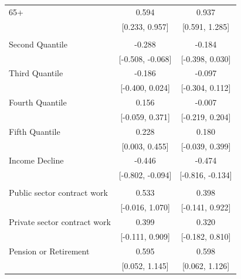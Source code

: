 \documentclass[
  10,
  letterpaper,
  DIV=11,
  numbers=noendperiod]{scrartcl}
\begin{document}
\begin{table}
\begin{tabular}[t]{lcc}
\hspace{1em}65+ & 0.594 & 0.937\\
\hspace{1em} & {}[0.233, 0.957] & {}[0.591, 1.285]\\
\addlinespace[0.3em]
\multicolumn{3}{l}{\cellcolor[HTML]{3498DB}{\textbf{Income}}}\\
\hspace{1em}Second Quantile & -0.288 & -0.184\\
\hspace{1em} & {}[-0.508, -0.068] & {}[-0.398, 0.030]\\
\hspace{1em}Third Quantile & -0.186 & -0.097\\
\hspace{1em} & {}[-0.400, 0.024] & {}[-0.304, 0.112]\\
\hspace{1em}Fourth Quantile & 0.156 & -0.007\\
\hspace{1em} & {}[-0.059, 0.371] & {}[-0.219, 0.204]\\
\hspace{1em}Fifth Quantile & 0.228 & 0.180\\
\hspace{1em} & {}[0.003, 0.455] & {}[-0.039, 0.399]\\
\hspace{1em}Income Decline & -0.446 & -0.474\\
\hspace{1em} & {}[-0.802, -0.094] & {}[-0.816, -0.134]\\
\addlinespace[0.3em]
\multicolumn{3}{l}{\cellcolor[HTML]{3498DB}{\textbf{Income Source}}}\\
\hspace{1em}Public sector contract work & 0.533 & 0.398\\
\hspace{1em} & {}[-0.016, 1.070] & {}[-0.141, 0.922]\\
\hspace{1em}Private sector contract work & 0.399 & 0.320\\
\hspace{1em} & {}[-0.111, 0.909] & {}[-0.182, 0.810]\\
\hspace{1em}Pension or Retirement & 0.595 & 0.598\\
\hspace{1em} & {}[0.052, 1.145] & {}[0.062, 1.126]\\

\end{tabular}
\end{table}
\end{document}
